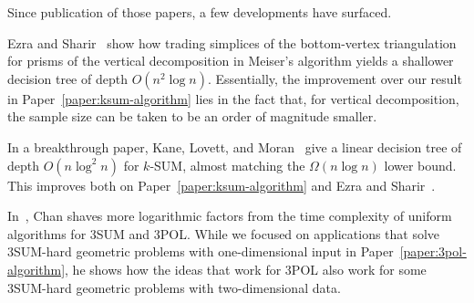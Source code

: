 Since publication of those papers, a few developments have surfaced.

Ezra and Sharir~\cite{ES17} show how trading simplices of the bottom-vertex
triangulation for prisms of the vertical decomposition in Meiser's algorithm
yields a shallower decision tree of depth \(O(n^2 \log n)\). Essentially, the
improvement over our result in Paper~\ref{paper:ksum-algorithm}
lies in the fact that, for vertical decomposition, the sample size can be taken
to be an order of magnitude smaller.



In a breakthrough paper, Kane, Lovett, and Moran~\cite{KLM18} give a
linear decision tree of depth \(O(n \log^2 n)\) for \(k\)-SUM, almost
matching the \(\Omega(n \log n)\) lower bound. This improves both on
Paper~\ref{paper:ksum-algorithm} and Ezra and Sharir~\cite{ES17}.

In~\cite{Ch18}, Chan shaves more logarithmic factors from the time complexity
of uniform algorithms for 3SUM and 3POL. While we focused on applications that solve
3SUM-hard geometric problems with one-dimensional input in
Paper~\ref{paper:3pol-algorithm}, he shows how
the ideas that work for 3POL also work for some 3SUM-hard geometric problems
with two-dimensional data.
